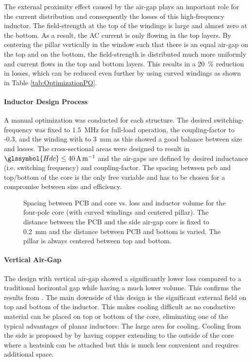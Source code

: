 \documentclass{IPEC2026}
\newcommand{\sbl}[1]{\glssymbol{#1}}
\newcommand{\ac}{\gls}
\begin{document}
The external proximity effect caused by the air-gap plays an important role for the current distribution and consequently the losses of this high-frequency inductor. The field-strength at the top of the windings is large and almost zero at the bottom. As a result, the AC current is only flowing in the top layers. By centering the pillar vertically in the window such that there is an equal air-gap on the top and on the bottom, the field-strength is distributed much more uniformly and current flows in the top and bottom layers. This results in a \qty{20}{\percent} reduction in losses, which can be reduced even further by using curved windings as shown in Table \ref{tab:OptimizationPQ}.

\paragraph{Inductor Design Process}
A manual optimization was conducted for each structure. The desired switching-frequency was fixed to \qty{1.5}{\MHz} for full-load operation, the coupling-factor to -0.3, and the winding with to \qty{3}{\mm} as this showed a good balance between size and losses. The cross-sectional areas were designed to result in $\sbl{Hdc} \leq \qty{40}{\A\per\m}$ and the air-gaps are defined by desired inductance (i.e. switching frequency) and coupling-factor. The spacing between \ac{pcb} and top/bottom of the core is the only free variable and has to be chosen for a compromise between size and efficiency.

\begin{figure}
  \centering
  
  \caption{Spacing between PCB and core vs. loss and inductor volume for the four-pole core (with curved windings and centered pillar). The distance between the PCB and the side air-gap core is fixed to \qty{0.2}{\mm} and the distance between PCB and bottom is varied. The pillar is always centered between top and bottom.}
  \label{fig:fourPole_spacingVsLoss}
\end{figure}

\paragraph{Vertical Air-Gap}
The design with vertical air-gap showed a significantly lower loss compared to a traditional horizontal gap while having a much lower volume. This confirms the results from \cite{schaferNovelHighlyEfficient2020}. The main downside of this design is the significant external field on top and bottom of the inductor. This makes cooling difficult as no conductive material can be placed on top or bottom of the core, eliminating one of the typical advantages of planar inductors: The large area for cooling. Cooling from the side is proposed by \cite{schaferNovelHighlyEfficient2020} by having copper extending to the outside of the core where a heatsink can be attached but this is much less convenient and requires additional space.
\end{document}
